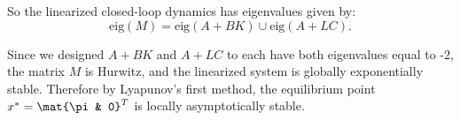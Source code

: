 \documentclass{homework}
\begin{document}
\begin{letterenum}
So the linearized closed-loop dynamics has eigenvalues given by:
\begin{equation*}
    \text{eig}(M) = \text{eig}(A + BK) \cup \text{eig}(A + LC).
\end{equation*}

Since we designed $A + BK$ and $A + LC$ to each have both eigenvalues equal to -2,
the matrix $M$ is Hurwitz, and the linearized system is globally exponentially stable.
Therefore by Lyapunov's first method, the
equilibrium point $x^* = \mat{\pi & 0}^T$ is locally asymptotically stable.
\end{letterenum}
\end{document}
